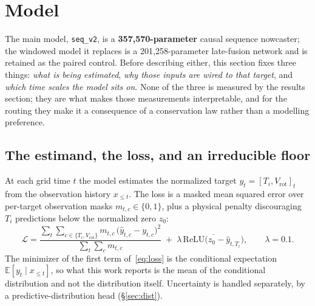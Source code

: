 \documentclass[10pt]{article}
\newcommand{\Ti}{\ensuremath{T_i}}
\newcommand{\Vrot}{\ensuremath{V_\mathrm{rot}}}
\newcommand{\seqv}{\texttt{seq\_v2}}
\begin{document}
\section{Model}
\label{sec:model}

The main model, \seqv{}, is a \textbf{357{,}570-parameter} causal sequence
nowcaster; the windowed model it replaces is a 201{,}258-parameter late-fusion
network and is retained as the paired control. Before describing either, this
section fixes three things: \emph{what is being estimated}, \emph{why those inputs
are wired to that target}, and \emph{which time scales the model sits on}. None of
the three is measured by the results section; they are what makes those
measurements interpretable, and for the routing they make it a consequence of a
conservation law rather than a modelling preference.

\subsection{The estimand, the loss, and an irreducible floor}
\label{sec:model:target}

At each grid time $t$ the model estimates the normalized target
$y_t=[\Ti,\Vrot]_t$ from the observation history $x_{\le t}$. The loss is a masked
mean squared error over per-target observation masks $m_{t,c}\in\{0,1\}$, plus a
physical penalty discouraging \Ti{} predictions below the normalized zero $z_0$:
%
\begin{equation}
  \mathcal{L}
  = \frac{\sum_{t}\sum_{c\in\{\Ti,\Vrot\}} m_{t,c}\,\bigl(\hat y_{t,c}-y_{t,c}\bigr)^2}
         {\sum_{t}\sum_{c} m_{t,c}}
  \;+\; \lambda\,\overline{\mathrm{ReLU}\bigl(z_0-\hat y_{t,\Ti}\bigr)},
  \qquad \lambda = 0.1 .
  \label{eq:loss}
\end{equation}
%
The minimizer of the first term of~\eqref{eq:loss} is the conditional expectation
$\mathbb{E}[y_t\mid x_{\le t}]$, so what this work reports is the mean of the
conditional distribution and not the distribution itself. Uncertainty is handled
separately, by a predictive-distribution head (\S\ref{sec:dist}).
\end{document}
